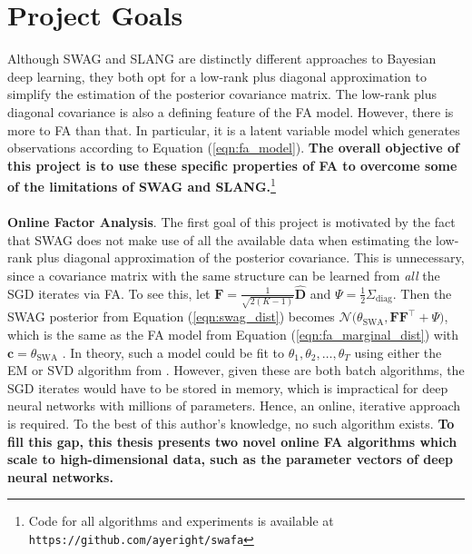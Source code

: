 \documentclass[msc,deptreport.inf]{infthesis} %
\newcommand{\matr}[1]{\mathbf{#1}}
\begin{document}
\section{Project Goals}

Although SWAG and SLANG are distinctly different approaches to Bayesian deep learning, they both opt for a low-rank plus diagonal approximation to simplify the estimation of the posterior covariance matrix. The low-rank plus diagonal covariance is also a defining feature of the FA model. However, there is more to FA than that. In particular, it is a latent variable model which generates observations according to Equation (\ref{eqn:fa_model}). \textbf{The overall objective of this project is to use these specific properties of FA to overcome some of the limitations of SWAG and SLANG.}\footnote{Code for all algorithms and experiments is available at \texttt{https://github.com/ayeright/swafa}}
\\ \\
\textbf{Online Factor Analysis}.
The first goal of this project is motivated by the fact that SWAG does not make use of all the available data when estimating the low-rank plus diagonal approximation of the posterior covariance. This is unnecessary, since a covariance matrix with the same structure can be learned from \emph{all} the SGD iterates via FA. To see this, let $\matr{F} = \frac{1}{\sqrt{2(K-1)}} \hat{\matr{D}}$ and $\Psi = \frac{1}{2} \Sigma_\text{diag}$. Then the SWAG posterior from Equation (\ref{eqn:swag_dist}) becomes $\mathcal{N}\big(\theta_\text{SWA}, \matr{FF}^{\intercal} + \Psi\big)$,
which is the same as the FA model from Equation (\ref{eqn:fa_marginal_dist}) with $\matr{c} = \theta_\text{SWA}$ \cite{brownlie2021}. In theory, such a model could be fit to $\theta_1, \theta_2, \dots, \theta_T$ using either the EM or SVD algorithm from \cite{barber2007}. However, given these are both batch algorithms, the SGD iterates would have to be stored in memory, which is impractical for deep neural networks with millions of parameters. Hence, an online, iterative approach is required. To the best of this author's knowledge, no such algorithm exists. \textbf{To fill this gap, this thesis presents two novel online FA algorithms which scale to high-dimensional data, such as the parameter vectors of deep neural networks.}
\end{document}
